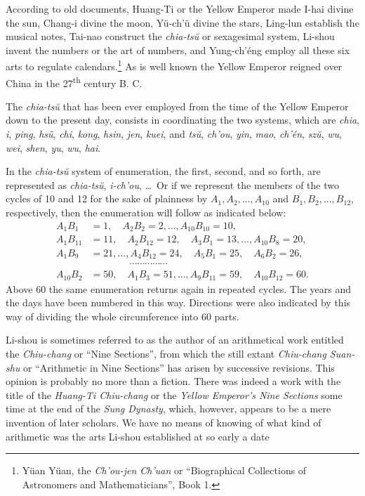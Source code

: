 \documentclass[11pt]{article}
\newcommand{\scanfooter}{}
\begin{document}
According to old documents, Huang-Ti or the Yellow Emperor made I-hai divine the sun, Chang-i divine the moon, Yü-ch’ü divine the stars, Ling-lun establish the musical notes, Tai-nao construct the \emph{chia-tsŭ} or sexagesimal system, Li-shou invent the numbers or the art of numbers, and Yung-ch’éng employ all these six arts to regulate calendars.\footnote{Yüan Yüan, the \emph{Ch’ou-jen Ch’uan} or ``Biographical Collections of Astronomers and Mathematicians'', Book 1.} As is well known the Yellow Emperor reigned over China in the 27\textsuperscript{th} century B. C.

The \emph{chia-tsŭ} that has been ever employed from the time of the Yellow Emperor down to the present day, consists in coordinating the two systems, which are \emph{chia}, \emph{i}, \emph{ping}, \emph{hsü}, \emph{chi}, \emph{kong}, \emph{hsin}, \emph{jen}, \emph{kuei}, and \emph{tsŭ}, \emph{ch’ou}, \emph{yin}, \emph{mao}, \emph{ch’én}, \emph{szŭ}, \emph{wu}, \emph{wei}, \emph{shen}, \emph{yu}, \emph{wu}, \emph{hai}.

In the \emph{chia-tsŭ} system of enumeration, the first, second, and so forth, are represented as \emph{chia-tsŭ}, \emph{i-ch’ou}, \ldots\ Or if we represent the members of the two cycles of 10 and 12 for the sake of plainness by $A_1,A_2,\ldots,A_{10}$ and $B_1,B_2,\ldots,B_{12}$, respectively, then the enumeration will follow as indicated below:
\[
\begin{aligned}
A_1B_1&=1,\quad A_2B_2=2,\ldots, A_{10}B_{10}=10,\\
A_1B_{11}&=11,\quad A_2B_{12}=12,\quad A_3B_1=13,\ldots, A_{10}B_8=20,\\
A_1B_9&=21,\ldots, A_4B_{12}=24,\quad A_5B_1=25,\quad A_6B_2=26,\\[-.5em]
&\hspace{4em}\cdots\cdots\cdots\cdots\cdots\\[-.5em]
A_{10}B_2&=50,\quad A_1B_3=51,\ldots, A_9B_{11}=59,\quad A_{10}B_{12}=60.
\end{aligned}
\]
Above 60 the same enumeration returns again in repeated cycles. The years and the days have been numbered in this way. Directions were also indicated by this way of dividing the whole circumference into 60 parts.

Li-shou is sometimes referred to as the author of an arithmetical work entitled the \emph{Chiu-chang} or ``Nine Sections'', from which the still extant \emph{Chiu-chang Suan-shu} or ``Arithmetic in Nine Sections'' has arisen by successive revisions. This opinion is probably no more than a fiction. There was indeed a work with the title of the \emph{Huang-Ti Chiu-chang} or the \emph{Yellow Emperor's Nine Sections} some time at the end of the \emph{Sung Dynasty}, which, however, appears to be a mere invention of later scholars. We have no means of knowing of what kind of arithmetic was the arts Li-shou established at so early a date
\scanfooter
\end{document}
